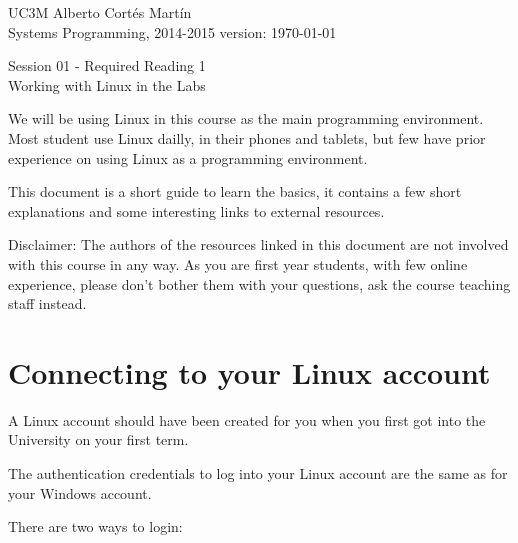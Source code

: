 \documentclass[a4paper, 12pt]{article}
\newcommand{\realtitle}{Session 01 - Required Reading 1}
\begin{document}
\makebox[\linewidth]{\rule{\textwidth}{0.4pt}}
UC3M \hfill Alberto Cortés Martín\\
Systems Programming, 2014-2015 \hfill version: \today\\
\makebox[\linewidth]{\rule{\textwidth}{0.4pt}}
\begin{center}
  \Large{\realtitle}\\Working with Linux in the Labs
\end{center}
\makebox[\linewidth]{\rule{\textwidth}{0.4pt}}
\vspace{0.5cm}

\tableofcontents
\vspace{1cm}

We will be using Linux in this course as the main programming environment.
Most student use Linux dailly, in their phones and tablets, but few have prior
experience on using Linux as a programming environment.

This document is a short guide to learn the basics, it contains a few short
explanations and some interesting links to external resources.

Disclaimer: The authors of the resources linked in this document are not
involved with this course in any way. As you are first year students, with few
online experience, please don't bother them with your questions, ask the
course teaching staff instead.

\section{Connecting to your Linux account}

A Linux account should have been created for you when you first got into the
University on your first term.

The authentication credentials to log into your Linux account are the same as
for your Windows account.

There are two ways to login:
\end{document}
